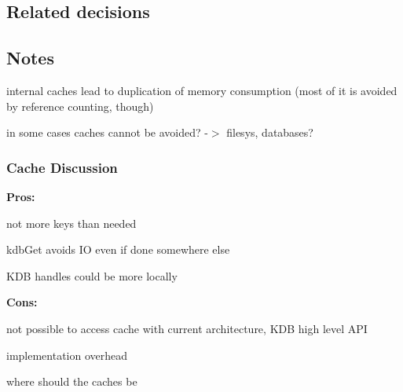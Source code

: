 \subsection*{Related decisions}

\subsection*{Notes}

internal caches lead to duplication of memory consumption (most of it is avoided by reference counting, though)

in some cases caches cannot be avoided? -\/$>$ filesys, databases?

\subsubsection*{Cache Discussion}

{\bfseries Pros\+:}


\begin{DoxyItemize}
\item not more keys than needed
\item kdb\+Get avoids IO even if done somewhere else
\item K\+DB handles could be more locally
\end{DoxyItemize}

{\bfseries Cons\+:}


\begin{DoxyItemize}
\item not possible to access cache with current architecture, K\+DB high level A\+PI
\item implementation overhead
\item where should the caches be 
\end{DoxyItemize}